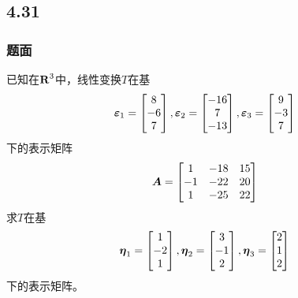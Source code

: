 \documentclass{beamer}
\begin{document}
\subsection*{4.31}
\begin{frame}
    \frametitle{题面}
    已知在\(\boldsymbol{\mathrm{R}}^3\)中，线性变换\(T\)在基
    \begin{equation*}
        \boldsymbol{\varepsilon}_1=\begin{bmatrix}8\\-6\\7\end{bmatrix},
        \boldsymbol{\varepsilon}_2=\begin{bmatrix}-16\\7\\-13\end{bmatrix},
        \boldsymbol{\varepsilon}_3=\begin{bmatrix}9\\-3\\7\end{bmatrix}
    \end{equation*}
    下的表示矩阵
    \begin{equation*}
        \boldsymbol{A}=
        \begin{bmatrix}
            1  & -18 & 15 \\
            -1 & -22 & 20 \\
            1  & -25 & 22
        \end{bmatrix}
    \end{equation*}
    求\(T\)在基
    \begin{equation*}
        \boldsymbol{\eta}_1=\begin{bmatrix}1\\-2\\1\end{bmatrix},
        \boldsymbol{\eta}_2=\begin{bmatrix}3\\-1\\2\end{bmatrix},
        \boldsymbol{\eta}_3=\begin{bmatrix}2\\1\\2\end{bmatrix}
    \end{equation*}
    下的表示矩阵。
\end{frame}
\end{document}
